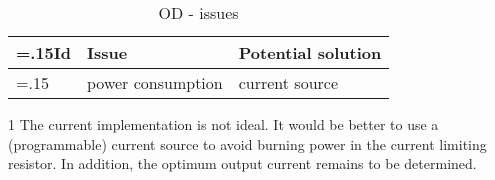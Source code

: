 \begin{table}[H]
    \centering
    \begin{threeparttable}[b]
        \begin{tabularx}{\linewidth}{ >{\hsize=.15\hsize}X >{\hsize=1.35\hsize}X >{\hsize=1.5\hsize}X }

            Id & Issue             & Potential solution      \\
            \midrule
            1  & power consumption & current source\tnote{1} \\
        \end{tabularx}
        \begin{tablenotes}
            \item [1] The current implementation is not ideal. It would be better to use a (programmable) current source to avoid burning power in the current
            limiting resistor. In addition, the optimum output current remains to be determined.
        \end{tablenotes}
    \end{threeparttable}
    \caption{OD - issues}
\end{table}